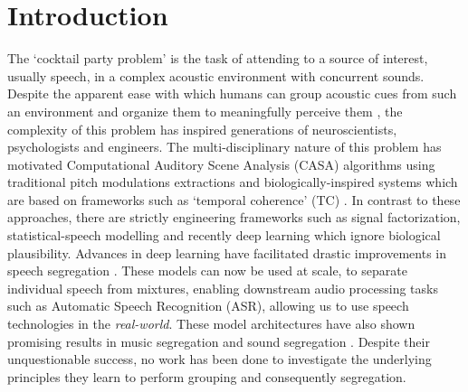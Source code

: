 \documentclass{article}
\begin{document}
\section{Introduction}
\label{sec:intro}
The `cocktail party problem' is the task of attending to a source of interest, usually speech, in a complex acoustic environment with concurrent sounds. Despite the apparent ease with which humans can group acoustic cues from such an environment and organize them to meaningfully perceive them \cite{bregman1994auditory}, the complexity of this problem has inspired generations of neuroscientists, psychologists and engineers. The multi-disciplinary nature of this problem has motivated Computational Auditory Scene Analysis (CASA) algorithms using traditional pitch modulations extractions \cite{vishnubhotla2009algorithm,stark2010source, wang1999separation} and biologically-inspired systems which are based on frameworks such as `temporal coherence' (TC) \cite{elhilali2008cocktail, krishnan2014segregating}. In contrast to these approaches, there are strictly engineering frameworks such as signal factorization, statistical-speech modelling \cite{ weiss2010speech, cooke2010monaural} and recently deep learning \cite{huang2015joint, hershey2016deep, zhang2016deep, luo2018tasnet, luo2019conv, luo2020dual, chen2020dual, kolbaek2017multitalker} which ignore biological plausibility. 
Advances in deep learning have facilitated drastic improvements in speech segregation \cite{ hershey2016deep, zhang2016deep, luo2018tasnet, luo2019conv, luo2020dual, chen2020dual, kolbaek2017multitalker}. These models can now be used at scale, to separate individual speech from mixtures, enabling downstream audio processing tasks such as Automatic Speech Recognition (ASR), allowing us to use speech technologies in the \textit{real-world}. These model architectures have also shown promising results in music segregation \cite{defossez2019music} and sound segregation \cite{kavalerov2019universal}. Despite their unquestionable success, no work has been done to investigate the underlying principles they learn to perform grouping and consequently segregation. 
\end{document}
